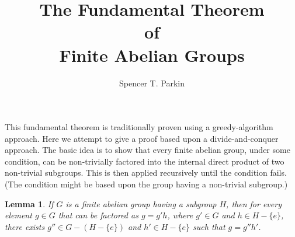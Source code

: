 \documentclass[12pt]{article}
\title{The Fundamental Theorem\\of\\Finite Abelian Groups}
\author{Spencer T. Parkin}
\newtheorem{lemma}{Lemma}[section]
\begin{document}
\maketitle

This fundamental theorem is traditionally proven using a greedy-algorithm approach.
Here we attempt to give a proof based upon a divide-and-conquer approach.
The basic idea is to show that every finite abelian group, under some condition, can be non-trivially
factored into the internal direct product of two non-trivial subgroups.  This is then applied recursively
until the condition fails.  (The condition might be based upon the group having a non-trivial subgroup.)

\begin{lemma}\label{lem_factor_element}
If $G$ is a finite abelian group having a subgroup $H$,
then for every element $g\in G$ that can be factored
as $g=g'h$, where $g'\in G$ and $h\in H-\{e\}$,
there exists $g''\in G-(H-\{e\})$ and $h'\in H-\{e\}$ such that $g=g''h'$.
\end{lemma}
\end{document}

